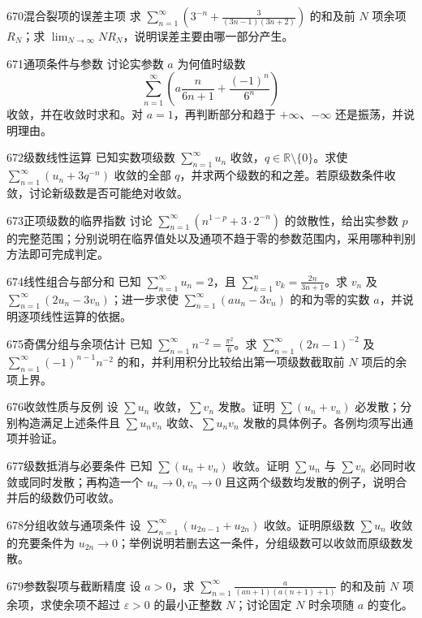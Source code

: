 \begin{exercise}{670}{混合裂项的误差主项}
求 $\sum_{n=1}^{\infty}(3^{-n}+\frac3{(3n-1)(3n+2)})$ 的和及前 $N$ 项余项 $R_N$；求 $\lim_{N\to\infty}NR_N$，说明误差主要由哪一部分产生。
\end{exercise}
\begin{exercise}{671}{通项条件与参数}
讨论实参数 $a$ 为何值时级数
\[\sum_{n=1}^{\infty}\left(a\frac{n}{6n+1}+\frac{(-1)^n}{6^n}\right)\]
收敛，并在收敛时求和。对 $a=1$，再判断部分和趋于 $+\infty$、$-\infty$ 还是振荡，并说明理由。
\end{exercise}
\begin{exercise}{672}{级数线性运算}
已知实数项级数 $\sum_{n=1}^{\infty}u_n$ 收敛，$q\in\mathbb R\setminus\{0\}$。求使 $\sum_{n=1}^{\infty}(u_n+3q^{-n})$ 收敛的全部 $q$，并求两个级数的和之差。若原级数条件收敛，讨论新级数是否可能绝对收敛。
\end{exercise}
\begin{exercise}{673}{正项级数的临界指数}
讨论 $\sum_{n=1}^{\infty}(n^{1-p}+3\cdot2^{-n})$ 的敛散性，给出实参数 $p$ 的完整范围；分别说明在临界值处以及通项不趋于零的参数范围内，采用哪种判别方法即可完成判定。
\end{exercise}
\begin{exercise}{674}{线性组合与部分和}
已知 $\sum_{n=1}^{\infty}u_n=2$，且 $\sum_{k=1}^{n}v_k=\frac{2n}{3n+1}$。求 $v_n$ 及 $\sum_{n=1}^{\infty}(2u_n-3v_n)$；进一步求使 $\sum_{n=1}^{\infty}(a u_n-3v_n)$ 的和为零的实数 $a$，并说明逐项线性运算的依据。
\end{exercise}
\begin{exercise}{675}{奇偶分组与余项估计}
已知 $\sum_{n=1}^{\infty}n^{-2}=\frac{\pi^2}{6}$。求 $\sum_{n=1}^{\infty}(2n-1)^{-2}$ 及 $\sum_{n=1}^{\infty}(-1)^{n-1}n^{-2}$ 的和，并利用积分比较给出第一项级数截取前 $N$ 项后的余项上界。
\end{exercise}
\begin{exercise}{676}{收敛性质与反例}
设 $\sum u_n$ 收敛，$\sum v_n$ 发散。证明 $\sum(u_n+v_n)$ 必发散；分别构造满足上述条件且 $\sum u_nv_n$ 收敛、$\sum u_nv_n$ 发散的具体例子。各例均须写出通项并验证。
\end{exercise}
\begin{exercise}{677}{级数抵消与必要条件}
已知 $\sum(u_n+v_n)$ 收敛。证明 $\sum u_n$ 与 $\sum v_n$ 必同时收敛或同时发散；再构造一个 $u_n\to0,v_n\to0$ 且这两个级数均发散的例子，说明合并后的级数仍可收敛。
\end{exercise}
\begin{exercise}{678}{分组收敛与通项条件}
设 $\sum_{n=1}^{\infty}(u_{2n-1}+u_{2n})$ 收敛。证明原级数 $\sum u_n$ 收敛的充要条件为 $u_{2n}\to0$；举例说明若删去这一条件，分组级数可以收敛而原级数发散。
\end{exercise}
\begin{exercise}{679}{参数裂项与截断精度}
设 $a>0$，求 $\sum_{n=1}^{\infty}\frac{a}{(an+1)(a(n+1)+1)}$ 的和及前 $N$ 项余项，求使余项不超过 $\varepsilon>0$ 的最小正整数 $N$；讨论固定 $N$ 时余项随 $a$ 的变化。
\end{exercise}
